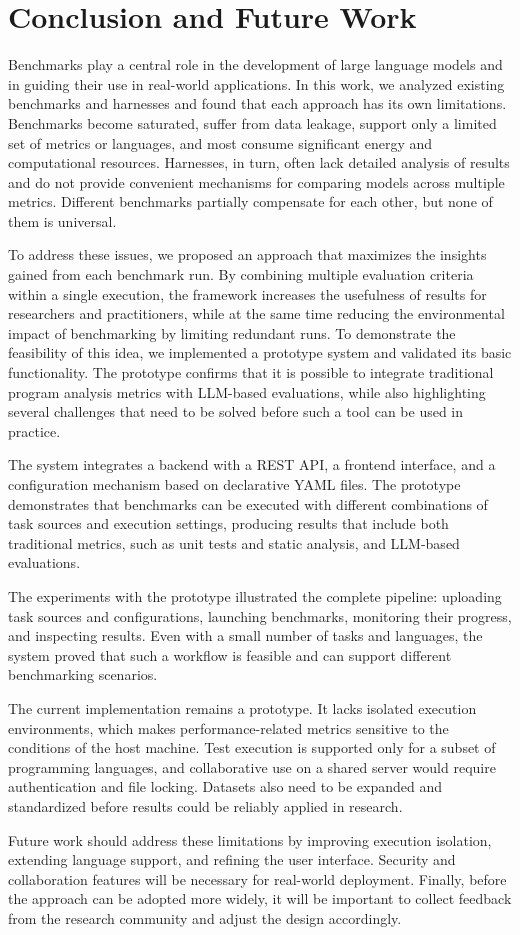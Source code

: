 \section{Conclusion and Future Work}

Benchmarks play a central role in the development of large language models and in guiding their use in real-world applications.
In this work, we analyzed existing benchmarks and harnesses and found that each approach has its own limitations.
Benchmarks become saturated, suffer from data leakage, support only a limited set of metrics or languages, and most consume significant energy and computational resources.
Harnesses, in turn, often lack detailed analysis of results and do not provide convenient mechanisms for comparing models across multiple metrics.
Different benchmarks partially compensate for each other, but none of them is universal.

To address these issues, we proposed an approach that maximizes the insights gained from each benchmark run.
By combining multiple evaluation criteria within a single execution, the framework increases the usefulness of results for researchers and practitioners, while at the same time reducing the environmental impact of benchmarking by limiting redundant runs.
To demonstrate the feasibility of this idea, we implemented a prototype system and validated its basic functionality.
The prototype confirms that it is possible to integrate traditional program analysis metrics with LLM-based evaluations, while also highlighting several challenges that need to be solved before such a tool can be used in practice.

The system integrates a backend with a REST API, a frontend interface, and a configuration mechanism based on declarative YAML files.
The prototype demonstrates that benchmarks can be executed with different combinations of task sources and execution settings, producing results that include both traditional metrics, such as unit tests and static analysis, and LLM-based evaluations.

The experiments with the prototype illustrated the complete pipeline: uploading task sources and configurations, launching benchmarks, monitoring their progress, and inspecting results.
Even with a small number of tasks and languages, the system proved that such a workflow is feasible and can support different benchmarking scenarios.

The current implementation remains a prototype.
It lacks isolated execution environments, which makes performance-related metrics sensitive to the conditions of the host machine.
Test execution is supported only for a subset of programming languages, and collaborative use on a shared server would require authentication and file locking.
Datasets also need to be expanded and standardized before results could be reliably applied in research.

Future work should address these limitations by improving execution isolation, extending language support, and refining the user interface.
Security and collaboration features will be necessary for real-world deployment.
Finally, before the approach can be adopted more widely, it will be important to collect feedback from the research community and adjust the design accordingly.
